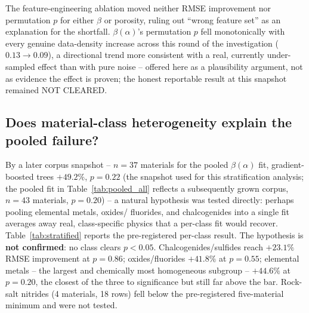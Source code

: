\documentclass[aip,amsmath,amssymb,reprint]{revtex4-1}
\begin{document}
The feature-engineering ablation moved neither RMSE improvement nor
permutation $p$ for either $\beta$ or porosity, ruling out ``wrong
feature set'' as an explanation for the shortfall. $\beta(\alpha)$'s
permutation $p$ fell monotonically with every genuine data-density
increase across this round of the investigation
($0.13 \rightarrow 0.09$), a directional trend more consistent with a
real, currently under-sampled effect than with pure noise -- offered
here as a plausibility argument, not as evidence the effect is
proven; the honest reportable result at this snapshot remained NOT
CLEARED.

\subsection{Does material-class heterogeneity explain the pooled failure?}
\label{ssec:stratification}

By a later corpus snapshot -- $n=37$ materials for the pooled
$\beta(\alpha)$ fit, gradient-boosted trees $+49.2\%$, $p=0.22$ (the
snapshot used for this stratification analysis; the pooled fit in
Table~\ref{tab:pooled_all} reflects a subsequently grown corpus,
$n=43$ materials, $p=0.20$) -- a natural hypothesis
was tested directly: perhaps pooling elemental metals, oxides/
fluorides, and chalcogenides into a single fit averages away real,
class-specific physics that a per-class fit would recover.
Table~\ref{tab:stratified} reports the pre-registered per-class
result. The hypothesis is \textbf{not confirmed}: no class clears
$p<0.05$. Chalcogenides/sulfides reach $+23.1\%$ RMSE improvement at
$p=0.86$; oxides/fluorides $+41.8\%$ at $p=0.55$; elemental metals --
the largest and chemically most homogeneous subgroup -- $+44.6\%$ at
$p=0.20$, the closest of the three to significance but still far above
the bar. Rock-salt nitrides (4 materials, 18 rows) fell below the
pre-registered five-material minimum and were not tested.
\end{document}
